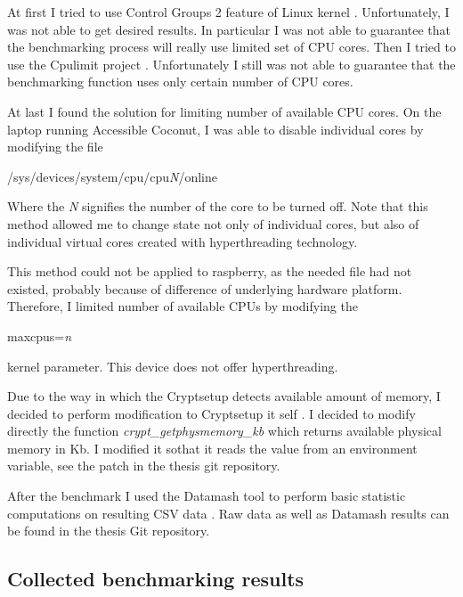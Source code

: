 \documentclass[nolof]{fithesis3}
\begin{document}
At first I tried to use Control Groups 2 feature of Linux kernel \parencite{cgroups2}. Unfortunately, I was not able to get desired results. In particular I was not able to guarantee that the benchmarking process will really use limited set of CPU cores. Then I tried to use the Cpulimit project \parencite{cpulimit}. Unfortunately I still was not able to guarantee that the benchmarking function uses only certain number of CPU cores.

At last I found the solution for limiting number of available CPU cores. On the laptop running Accessible Coconut, I was able to disable individual cores by modifying the file 
\begin{tt}
/sys/devices/system/cpu/cpu\emph{N}/online
\end{tt}
 Where the \emph{N} signifies the number of the core to be turned off. Note that this method allowed me to change state not only of individual cores, but also of individual virtual cores created with hyperthreading technology.

This method could not be applied to raspberry, as the needed file had not existed, probably because of difference of underlying hardware platform. Therefore, I limited number of available CPUs by modifying the 
\begin{tt}
maxcpus=\emph{n}
\end{tt}
 kernel parameter. This device does not offer hyperthreading.

Due to the way in which the Cryptsetup detects available amount of memory, I decided to perform modification to Cryptsetup it self \parencite{cryptsetuputils}. I decided to modify directly the function \emph{crypt\_getphysmemory\_kb} which returns available physical memory in Kb. I modified it sothat it reads the value from an environment variable, see the patch in the thesis git repository.

After the benchmark I used the Datamash tool to perform basic statistic computations on resulting CSV data \parencite{datamash}. Raw data as well as Datamash results can be found in the thesis Git repository.

\subsection{Collected benchmarking results}
\end{document}
